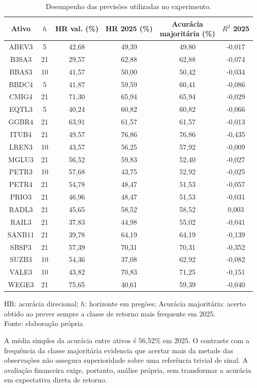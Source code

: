 \begin{table}[H]
\centering
\caption{Desempenho das previsões utilizadas no experimento.}
\label{tab:previsoes_pool_2025}
{\footnotesize
\renewcommand{\arraystretch}{0.85}
\begin{tabular}{@{}cccccc@{}}
\hline
Ativo & $h$ & HR val. (\%) & HR 2025 (\%) &
\shortstack{Acurácia\\majoritária (\%)} & $R^2$ 2025 \\ \hline
ABEV3 & 5  & 42,68 & 49,39 & 49,80 & -0,017 \\
B3SA3 & 21 & 29,57 & 62,88 & 62,88 & -0,074 \\
BBAS3 & 10 & 41,57 & 50,00 & 50,42 & -0,034 \\
BBDC4 & 5  & 41,87 & 59,59 & 60,41 & -0,086 \\
CMIG4 & 21 & 71,30 & 65,94 & 65,94 & -0,029 \\
EQTL3 & 5  & 40,24 & 60,82 & 60,82 & -0,066 \\
GGBR4 & 21 & 63,91 & 61,57 & 61,57 & -0,013 \\
ITUB4 & 21 & 49,57 & 76,86 & 76,86 & -0,435 \\
LREN3 & 10 & 43,57 & 56,25 & 57,92 & -0,009 \\
MGLU3 & 21 & 56,52 & 59,83 & 52,40 & -0,027 \\
PETR3 & 10 & 57,68 & 43,75 & 52,92 & -0,025 \\
PETR4 & 21 & 54,78 & 48,47 & 51,53 & -0,057 \\
PRIO3 & 21 & 46,96 & 48,47 & 51,53 & -0,031 \\
RADL3 & 21 & 45,65 & 58,52 & 58,52 & 0,003 \\
RAIL3 & 21 & 37,83 & 44,98 & 55,02 & -0,041 \\
SANB11 & 21 & 39,78 & 64,19 & 64,19 & -0,139 \\
SBSP3 & 21 & 57,39 & 70,31 & 70,31 & -0,352 \\
SUZB3 & 10 & 54,36 & 37,08 & 62,92 & -0,082 \\
VALE3 & 10 & 43,82 & 70,83 & 71,25 & -0,151 \\
WEGE3 & 21 & 75,65 & 40,61 & 59,39 & -0,040 \\
\hline
\end{tabular}}
\par\smallskip
{\footnotesize {HR: acurácia direcional; $h$: horizonte em pregões;
Acurácia majoritária: acerto obtido ao prever sempre a classe
de retorno mais frequente em 2025.}}\\
Fonte: elaboração própria
\end{table}
\newpage
A média simples da acurácia entre ativos é 56,52\% em 2025. O contraste com a frequência da classe majoritária evidencia que acertar mais da metade das observações não assegura superioridade sobre uma referência trivial de sinal. A avaliação financeira exige, portanto, análise própria, sem transformar a acurácia em expectativa direta de retorno.

